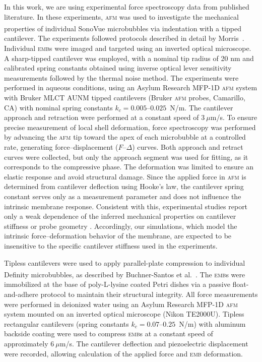 \documentclass[%
 aip,
 jcp,
 amsmath,amssymb,
 preprint,%
]{revtex4-1}
\begin{document}
In this work, we are using experimental force spectroscopy data from published literature. In these experiments, \textsc{afm} was used to investigate the mechanical properties of individual SonoVue\textsuperscript{\textregistered} microbubbles via indentation with a tipped cantilever. The experiments followed protocols described in detail by Morris~\cite{morris2014mechanical}. Individual \textsc{emb}s were imaged and targeted using an inverted optical microscope. A sharp-tipped cantilever was employed, with a nominal tip radius of 20 nm and calibrated spring constants obtained using inverse optical lever sensitivity measurements followed by the thermal noise method. The experiments were performed in aqueous conditions, using an Asylum Research MFP-1D \textsc{afm} system with Bruker MLCT AUNM tipped cantilevers (Bruker \textsc{afm} probes, Camarillo, CA) with nominal spring constants $k_c = 0.005$--$0.025$~N/m. The cantilever approach and retraction were performed at a constant speed of $3~\mu$m/s. To ensure precise measurement of local shell deformation, force spectroscopy was performed by advancing the \textsc{afm} tip toward the apex of each microbubble at a controlled rate, generating force--displacement ($F$--$\Delta$) curves. Both approach and retract curves were collected, but only the approach segment was used for fitting, as it corresponds to the compressive phase. The deformation was limited to ensure an elastic response and avoid structural damage. Since the applied force in \textsc{afm} is determined from cantilever deflection using Hooke's law, the cantilever spring constant serves only as a measurement parameter and does not influence the intrinsic membrane response. Consistent with this, experimental studies report only a weak dependence of the inferred mechanical properties on cantilever stiffness or probe geometry \cite{morris2014mechanical}. Accordingly, our simulations, which model the intrinsic force--deformation behavior of the membrane, are expected to be insensitive to the specific cantilever stiffness used in the experiments.

Tipless cantilevers were used to apply parallel-plate compression to individual Definity\textsuperscript{\textregistered} microbubbles, as described by Buchner-Santos et al.~\cite{buchner2012}. The \textsc{emb}s were immobilized at the base of poly-L-lysine coated Petri dishes via a passive float-and-adhere protocol to maintain their structural integrity. All force measurements were performed in deionized water using an Asylum Research MFP-1D \textsc{afm} system mounted on an inverted optical microscope (Nikon TE2000U). Tipless rectangular cantilevers (spring constants $k_c = 0.07$--$0.25$~N/m) with aluminum backside coating were used to compress \textsc{emb}s at a constant speed of approximately $6~\mu$m/s. The cantilever deflection and piezoelectric displacement were recorded, allowing calculation of the applied force and \textsc{emb} deformation. 
\end{document}
